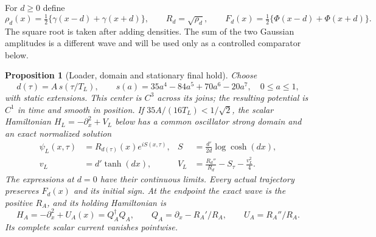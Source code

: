 \documentclass[11pt]{article}
\numberwithin{equation}{section}
\newtheorem{proposition}[theorem]{Proposition}
\theoremstyle{definition}
\theoremstyle{remark}
\begin{document}
For $d\geq0$ define
\[
 \rho_d(x)=\tfrac12\{\gamma(x-d)+\gamma(x+d)\},\qquad
 R_d=\sqrt{\rho_d},\qquad
 F_d(x)=\tfrac12\{\Phi(x-d)+\Phi(x+d)\}.
\]
The square root is taken after adding densities. The sum of the two
Gaussian amplitudes is a different wave and will be used only as a
controlled comparator below.

\begin{proposition}[Loader, domain and stationary final hold]
\label{p2r:prop:loader}
Choose
\begin{equation}\label{p2r:eq:loadercurve}
 d(\tau)=A\,s(\tau/T_L),\qquad
 s(a)=35a^4-84a^5+70a^6-20a^7,\quad 0\leq a\leq1,
\end{equation}
with static extensions. This center is $C^3$ across its joins; the
resulting potential is $C^1$ in time and smooth in position.
If $35A/(16T_L)<1/\sqrt2$, the scalar
Hamiltonian $H_L=-\partial_x^2+V_L$ below has a common oscillator
strong domain and an exact normalized solution
\begin{align}
 \psi_L(x,\tau)&=R_{d(\tau)}(x)e^{iS(x,\tau)},&
 S&=\frac{d'}{2d}\log\cosh(dx),\label{p2r:eq:loaderwave}\\
 v_L&=d'\tanh(dx),&
 V_L&=\frac{R_d''}{R_d}-S_\tau-\frac{v_L^2}{4}.
 \label{p2r:eq:loaderpotential}
\end{align}
The expressions at $d=0$ have their continuous limits. Every actual
trajectory preserves $F_d(x)$ and its initial sign. At the endpoint
the exact wave is the positive $R_A$, and its holding Hamiltonian is
\begin{equation}\label{p2r:eq:hold}
 H_A=-\partial_x^2+U_A(x)=Q_A^\dagger Q_A,\qquad
 Q_A=\partial_x-R_A'/R_A,\qquad U_A=R_A''/R_A .
\end{equation}
Its complete scalar current vanishes pointwise.
\end{proposition}
\end{document}
